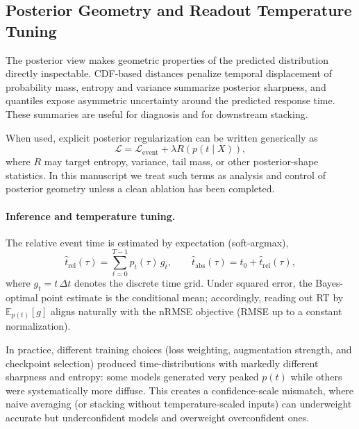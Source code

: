 \documentclass[12pt]{article}
\begin{document}
\subsection{Posterior Geometry and Readout Temperature Tuning}

The posterior view makes geometric properties of the predicted distribution directly inspectable. CDF-based distances penalize temporal displacement of probability mass, entropy and variance summarize posterior sharpness, and quantiles expose asymmetric uncertainty around the predicted response time. These summaries are useful for diagnosis and for downstream stacking.

When used, explicit posterior regularization can be written generically as
\begin{equation}
\label{eq:posterior_regularized_objective}
\mathcal{L} = \mathcal{L}_{\mathrm{event}} + \lambda R\!\left(p(t\mid X)\right),
\end{equation}
where $R$ may target entropy, variance, tail mass, or other posterior-shape statistics. In this manuscript we treat such terms as analysis and control of posterior geometry unless a clean ablation has been completed.

\paragraph{Inference and temperature tuning.}
The relative event time is estimated by expectation (soft-argmax),
\begin{equation}
\label{eq:rt_soft_argmax}
\hat t_{\mathrm{rel}}(\tau)=\sum_{t=0}^{T-1} p_t(\tau)\, g_t,
\qquad
\hat t_{\mathrm{abs}}(\tau)=t_0+\hat t_{\mathrm{rel}}(\tau),
\end{equation}
where $g_t=t\,\Delta t$ denotes the discrete time grid. Under squared error, the Bayes-optimal point estimate is the
conditional mean; accordingly, reading out RT by $\mathbb{E}_{p(t)}[g]$ aligns naturally with the nRMSE objective (RMSE
up to a constant normalization).

In practice, different training choices (loss weighting, augmentation strength, and checkpoint selection) produced
time-distributions with markedly different sharpness and entropy: some models generated very peaked $p(t)$ while others
were systematically more diffuse. This creates a confidence-scale mismatch, where naive averaging (or stacking without
temperature-scaled inputs) can underweight accurate but underconfident models and overweight overconfident ones.
\end{document}
